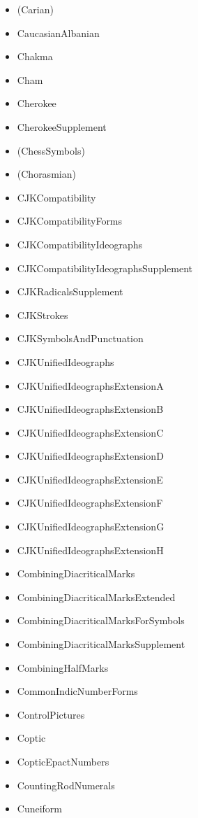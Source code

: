 \documentclass{article}
\newenvironment{itemlist}{%
  \begin{itemize}
  \setlength{\itemsep}{0pt}
  \setlength{\parsep}{0pt}
  \setlength{\topsep}{0pt}
  \setlength{\partopsep}{0pt}
  \setlength{\parskip}{0pt}
  \setlength{\labelsep}{5pt}}%
{
  \end{itemize}}
\begin{document}
\begin{multicols*}{2}
\begin{itemlist}
        \item (Carian)
        \item CaucasianAlbanian
        \item Chakma
        \item Cham
        \item Cherokee
        \item CherokeeSupplement
        \item (ChessSymbols)
        \item (Chorasmian)
        \item CJKCompatibility
        \item CJKCompatibilityForms
        \item CJKCompatibilityIdeographs
        \item CJKCompatibilityIdeographsSupplement
        \item CJKRadicalsSupplement
        \item CJKStrokes
        \item CJKSymbolsAndPunctuation
        \item CJKUnifiedIdeographs
        \item CJKUnifiedIdeographsExtensionA
        \item CJKUnifiedIdeographsExtensionB
        \item CJKUnifiedIdeographsExtensionC
        \item CJKUnifiedIdeographsExtensionD
        \item CJKUnifiedIdeographsExtensionE
        \item CJKUnifiedIdeographsExtensionF
        \item CJKUnifiedIdeographsExtensionG
        \item CJKUnifiedIdeographsExtensionH
        \item CombiningDiacriticalMarks
        \item CombiningDiacriticalMarksExtended
        \item CombiningDiacriticalMarksForSymbols
        \item CombiningDiacriticalMarksSupplement
        \item CombiningHalfMarks
        \item CommonIndicNumberForms
        \item ControlPictures
        \item Coptic
        \item CopticEpactNumbers
        \item CountingRodNumerals
        \item Cuneiform

\end{itemlist}
\end{multicols*}
\end{document}
